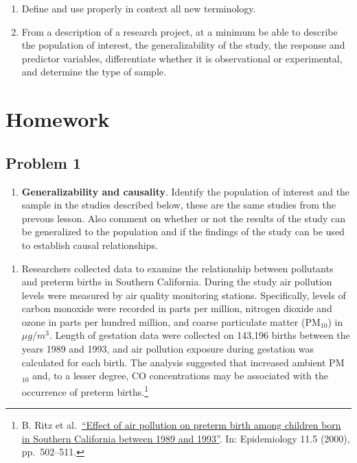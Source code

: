 \documentclass[
]{book}
\providecommand{\tightlist}{%
  \setlength{\itemsep}{0pt}\setlength{\parskip}{0pt}}
\begin{document}
\begin{enumerate}
\def\labelenumi{\arabic{enumi})}
\tightlist
\item
  Define and use properly in context all new terminology.\\
\item
  From a description of a research project, at a minimum be able to describe the population of interest, the generalizability of the study, the response and predictor variables, differentiate whether it is observational or experimental, and determine the type of sample.
\end{enumerate}

\hypertarget{homework-2}{%
\section{Homework}\label{homework-2}}

\hypertarget{problem-1-2}{%
\subsection{Problem 1}\label{problem-1-2}}

\begin{enumerate}
\def\labelenumi{\arabic{enumi}.}
\tightlist
\item
  \textbf{Generalizability and causality}. Identify the population of interest and the sample in the studies described below, these are the same studies from the prevous lesson. Also comment on whether or not the results of the study can be generalized to the population and if the findings of the study can be used to establish causal relationships.
\end{enumerate}

\begin{enumerate}
\def\labelenumi{\alph{enumi}.}
\tightlist
\item
  Researchers collected data to examine the relationship between pollutants and preterm births in Southern California. During the study air pollution levels were measured by air quality monitoring stations. Specifically, levels of carbon monoxide were recorded in parts per million, nitrogen dioxide and ozone in parts per hundred million, and coarse particulate matter (PM\(_{10}\)) in \(\mu g/m^3\). Length of gestation data were collected on 143,196 births between the years 1989 and 1993, and air pollution exposure during gestation was calculated for each birth. The analysis suggested that increased ambient PM\(_{10}\) and, to a lesser degree, CO concentrations may be associated with the occurrence of preterm births.\footnote{B. Ritz et al.~\href{http://journals.lww.com/epidem/Abstract/2000/09000/Effect_of_Air_Pollution_on_Preterm_Birth_Among.4.aspx}{``Effect of air pollution on preterm birth among children born in Southern California
    between 1989 and 1993''}. In: Epidemiology 11.5 (2000), pp.~502--511.}
\end{enumerate}
\end{document}
